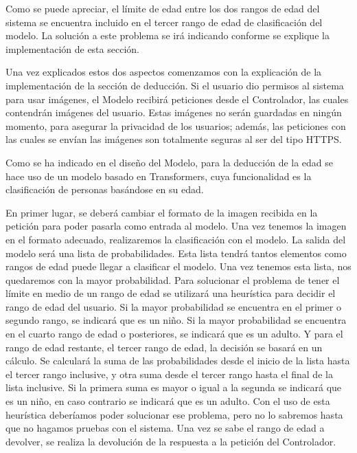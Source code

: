 Como se puede apreciar, el límite de edad entre los dos rangos de edad del sistema se encuentra incluido en el tercer rango de edad de clasificación del modelo. La solución a este problema se irá indicando conforme se explique la implementación de esta sección.

Una vez explicados estos dos aspectos comenzamos con la explicación de la implementación de la sección de deducción. Si el usuario dio permisos al sistema para usar imágenes, el Modelo recibirá peticiones desde el Controlador, las cuales contendrán imágenes del usuario. Estas imágenes no serán guardadas en ningún momento, para asegurar la privacidad de los usuarios; además, las peticiones con las cuales se envían las imágenes son totalmente seguras al ser del tipo HTTPS.

Como se ha indicado en el diseño del Modelo, para la deducción de la edad se hace uso de un modelo basado en Transformers, cuya funcionalidad es la clasificación de personas basándose en su edad.

En primer lugar, se deberá cambiar el formato de la imagen recibida en la petición para poder pasarla como entrada al modelo. Una vez tenemos la imagen en el formato adecuado, realizaremos la clasificación con el modelo. La salida del modelo será una lista de probabilidades. Esta lista tendrá tantos elementos como rangos de edad puede llegar a clasificar el modelo. Una vez tenemos esta lista, nos quedaremos con la mayor probabilidad. Para solucionar el problema de tener el límite en medio de un rango de edad se utilizará una heurística para decidir el rango de edad del usuario. Si la mayor probabilidad se encuentra en el primer o segundo rango, se indicará que es un niño. Si la mayor probabilidad se encuentra en el cuarto rango de edad o posteriores, se indicará que es un adulto. Y para el rango de edad restante, el tercer rango de edad, la decisión se basará en un cálculo. Se calculará la suma de las probabilidades desde el inicio de la lista hasta el tercer rango inclusive, y otra suma desde el tercer rango hasta el final de la lista inclusive. Si la primera suma es mayor o igual a la segunda se indicará que es un niño, en caso contrario se indicará que es un adulto. Con el uso de esta heurística deberíamos poder solucionar ese problema, pero no lo sabremos hasta que no hagamos pruebas con el sistema. Una vez se sabe el rango de edad a devolver, se realiza la devolución de la respuesta a la petición del Controlador.

